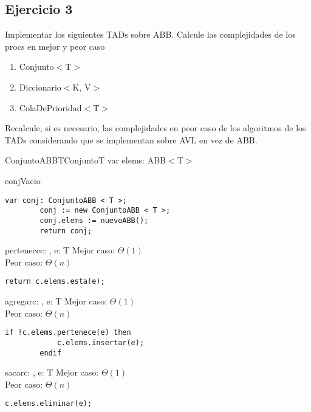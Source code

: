 \subsection{Ejercicio 3}
Implementar los siguientes TADs sobre ABB. Calcule las complejidades de los procs en mejor y peor caso
\begin{enumerate}
	\item Conjunto$<$T$>$
	\item Diccionario$<$K, V$>$
	\item ColaDePrioridad$<$T$>$
\end{enumerate}

Recalcule, si es necesario, las complejidades en peor caso de los algoritmos de los TADs considerando que se implementan sobre AVL en vez de ABB.

\begin{module}{ConjuntoABB}{T}{Conjunto}{T}
	var elems: ABB$<$T$>$

	\begin{proc}{conjVacio}{}{\moduletype}
		\begin{lstlisting}[numbers=none,frame=none]
		var conj: ConjuntoABB < T >;
		conj := new ConjuntoABB < T >;
		conj.elems := nuevoABB();
		return conj;
		\end{lstlisting}
	\end{proc}

	\begin{proc}{pertenece}{\In c: \moduletype, \In e: T}{\bool}
		Mejor caso: $\Theta(1)$\\
		Peor caso: $\Theta(n)$
		\begin{lstlisting}[numbers=none,frame=none]
		return c.elems.esta(e);
		\end{lstlisting}
	\end{proc}

	\begin{proc}{agregar}{\Inout c: \moduletype, \In e: T}{}
		Mejor caso: $\Theta(1)$\\
		Peor caso: $\Theta(n)$
		\begin{lstlisting}[numbers=none,frame=none]
		if !c.elems.pertenece(e) then
			c.elems.insertar(e);
		endif
		\end{lstlisting}
	\end{proc}

	\begin{proc}{sacar}{\Inout c: \moduletype, \In e: T}{}
		Mejor caso: $\Theta(1)$\\
		Peor caso: $\Theta(n)$
		\begin{lstlisting}[numbers=none,frame=none]
		c.elems.eliminar(e);
		\end{lstlisting}
	\end{proc}


\end{module}
